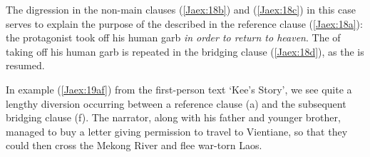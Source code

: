 \documentclass[output=paper]{LSP/langsci}
\begin{document}
\noindent
The digression in the non-main clauses (\ref{Jaex:18b}) and (\ref{Jaex:18c}) in this case serves to explain the purpose of the  described in the reference clause (\ref{Jaex:18a}): the protagonist took off his human garb \textit{in order to return to heaven}. The  of taking off his human garb is repeated in the bridging clause (\ref{Jaex:18d}), as the  is resumed.
 
In example (\ref{Jaex:19af}) from the first-person  text `Kee’s Story', we see quite a lengthy diversion occurring between a reference clause (a) and the subsequent bridging clause (f). The narrator, along with his father and younger brother, managed to buy a letter giving permission to travel to Vientiane, so that they could then cross the Mekong River and flee war-torn Laos.
 
\end{document}
